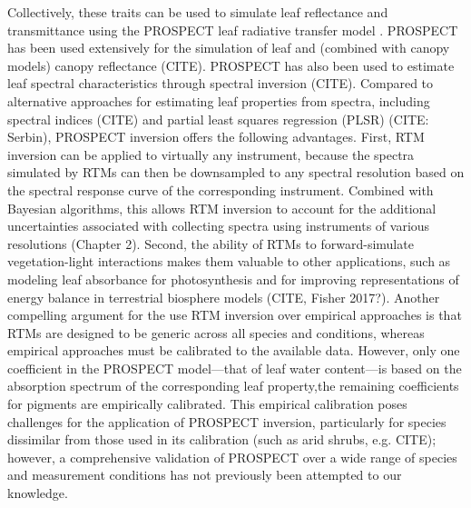 Collectively, these traits can be used to simulate leaf reflectance and transmittance using the PROSPECT leaf radiative transfer model \cite{jacquemoud1990_prospect,feret2008_prospect,feret2017_prospectd}.
PROSPECT has been used extensively for the simulation of leaf and (combined with canopy models) canopy reflectance (CITE).
PROSPECT has also been used to estimate leaf spectral characteristics through spectral inversion (CITE).
Compared to alternative approaches for estimating leaf properties from spectra, including spectral indices (CITE) and partial least squares regression (PLSR) \cite{barnes_2017_beyond} (CITE: Serbin), PROSPECT inversion offers the following advantages.
First, RTM inversion can be applied to virtually any instrument, because the spectra simulated by RTMs can then be downsampled to any spectral resolution based on the spectral response curve of the corresponding instrument.
Combined with Bayesian algorithms, this allows RTM inversion to account for the additional uncertainties associated with collecting spectra using instruments of various resolutions (Chapter 2).
Second, the ability of RTMs to forward-simulate vegetation-light interactions makes them valuable to other applications, such as modeling leaf absorbance for photosynthesis and for improving representations of energy balance in terrestrial biosphere models (CITE, Fisher 2017?).
Another compelling argument for the use RTM inversion over empirical approaches is that RTMs are designed to be generic across all species and conditions, whereas empirical approaches must be calibrated to the available data.
However, only one coefficient in the PROSPECT model---that of leaf water content---is based on the absorption spectrum of the corresponding leaf property,the remaining coefficients for pigments are empirically calibrated.
This empirical calibration poses challenges for the application of PROSPECT inversion, particularly for species dissimilar from those used in its calibration (such as arid shrubs, e.g. CITE); however, a comprehensive validation of PROSPECT over a wide range of species and measurement conditions has not previously been attempted to our knowledge.

